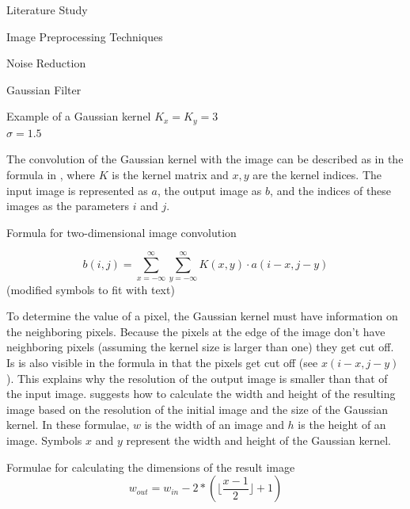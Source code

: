 \documentclass{matthijs}
\begin{document}
\begin{hoofdstuk}{Literature Study}
\begin{paragraaf}{Image Preprocessing Techniques}
\begin{subparagraaf}{Noise Reduction}
\begin{subsubparagraaf}{Gaussian Filter}
\begin{figuur}{Example of a Gaussian kernel}
						$K_x = K_y = 3$ \\
						$\sigma = 1.5$
					
					\end{figuur}
					
					\bigskip

					The convolution of the Gaussian kernel with the image can be described as in the formula in , where $K$ is the kernel matrix and $x,y$ are the kernel indices.
					The input image is represented as $a$, the output image as $b$, and the indices of these images as the parameters $i$ and $j$.
					
					\begin{figuur}{Formula for two-dimensional image convolution}

						\begin{equation*}
							b(i, j) = \sum_{x = -\infty}^{\infty} \sum_{y = -\infty}^{\infty} K(x, y) \cdot a(i - x, j - y)
						\end{equation*}
						\cite{sneha2018convolution} (modified symbols to fit with text)
					
					\end{figuur}

					\bigskip

					To determine the value of a pixel, the Gaussian kernel must have information on the neighboring pixels.
					Because the pixels at the edge of the image don't have neighboring pixels (assuming the kernel size is larger than one) they get cut off.
					Is is also visible in the formula in  that the pixels get cut off (see $x(i-x, j-y)$).
					This explains why the resolution of the output image is smaller than that of the input image.
					 suggests how to calculate the width and height of the resulting image based on the resolution of the initial image and the size of the Gaussian kernel.
					In these formulae, $w$ is the width of an image and $h$ is the height of an image.
					Symbols $x$ and $y$ represent the width and height of the Gaussian kernel.

					\begin{figuur}{Formulae for calculating the dimensions of the result image}
						\begin{equation*}
							w_{out} = w_{in} - 2 * (\lfloor\frac{x - 1}{2}\rfloor + 1)
						\end{equation*}


\end{figuur}
\end{subsubparagraaf}
\end{subparagraaf}
\end{paragraaf}
\end{hoofdstuk}
\end{document}
